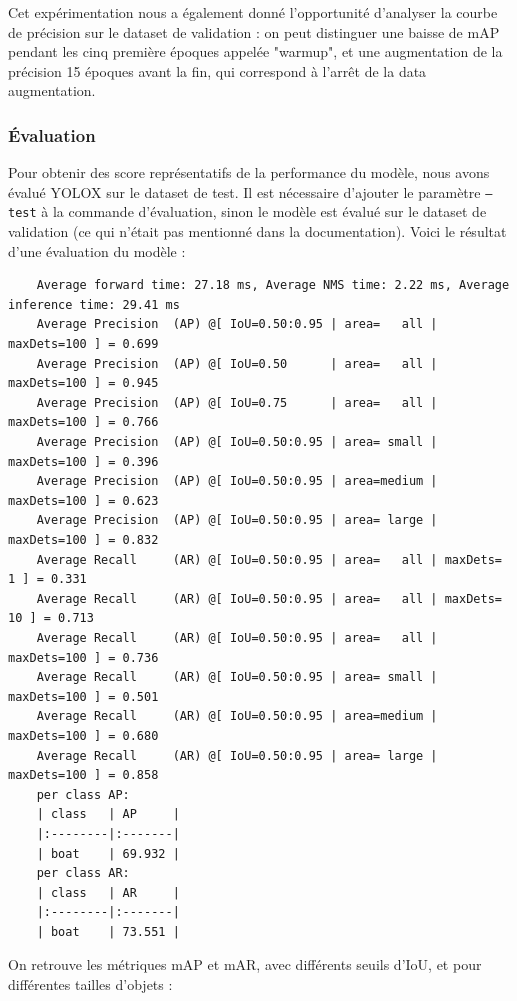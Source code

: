Cet expérimentation nous a également donné l'opportunité d'analyser la courbe de précision sur le dataset
de validation : on peut distinguer une baisse de mAP pendant les cinq première époques appelée "warmup",
et une augmentation de la précision 15 époques avant la fin, qui correspond à l'arrêt de la data augmentation.\\

\subsubsection{Évaluation}

Pour obtenir des score représentatifs de la performance du modèle, nous avons évalué YOLOX
sur le dataset de test. Il est nécessaire d'ajouter le paramètre \texttt{--test} à la commande
d'évaluation, sinon le modèle est évalué sur le dataset de validation (ce qui n'était pas mentionné
dans la documentation). Voici le résultat d'une évaluation du modèle :

\begin{verbatim}
    Average forward time: 27.18 ms, Average NMS time: 2.22 ms, Average inference time: 29.41 ms
    Average Precision  (AP) @[ IoU=0.50:0.95 | area=   all | maxDets=100 ] = 0.699
    Average Precision  (AP) @[ IoU=0.50      | area=   all | maxDets=100 ] = 0.945
    Average Precision  (AP) @[ IoU=0.75      | area=   all | maxDets=100 ] = 0.766
    Average Precision  (AP) @[ IoU=0.50:0.95 | area= small | maxDets=100 ] = 0.396
    Average Precision  (AP) @[ IoU=0.50:0.95 | area=medium | maxDets=100 ] = 0.623
    Average Precision  (AP) @[ IoU=0.50:0.95 | area= large | maxDets=100 ] = 0.832
    Average Recall     (AR) @[ IoU=0.50:0.95 | area=   all | maxDets=  1 ] = 0.331
    Average Recall     (AR) @[ IoU=0.50:0.95 | area=   all | maxDets= 10 ] = 0.713
    Average Recall     (AR) @[ IoU=0.50:0.95 | area=   all | maxDets=100 ] = 0.736
    Average Recall     (AR) @[ IoU=0.50:0.95 | area= small | maxDets=100 ] = 0.501
    Average Recall     (AR) @[ IoU=0.50:0.95 | area=medium | maxDets=100 ] = 0.680
    Average Recall     (AR) @[ IoU=0.50:0.95 | area= large | maxDets=100 ] = 0.858
    per class AP:
    | class   | AP     |
    |:--------|:-------|
    | boat    | 69.932 |
    per class AR:
    | class   | AR     |
    |:--------|:-------|
    | boat    | 73.551 |

\end{verbatim}

On retrouve les métriques mAP et mAR, avec différents seuils d'IoU, et pour différentes tailles d'objets :

